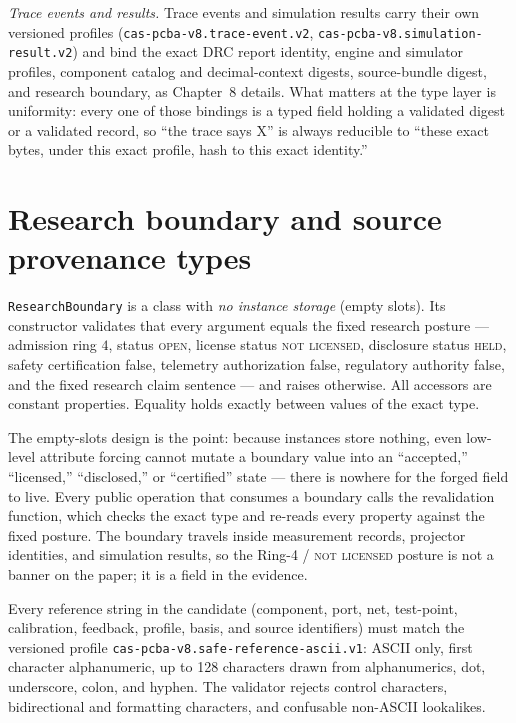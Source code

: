 \emph{Trace events and results.} Trace events and simulation results carry
their own versioned profiles (\texttt{cas-pcba-v8.trace-event.v2},
\texttt{cas-pcba-v8.simulation-result.v2}) and bind the exact DRC report
identity, engine and simulator profiles, component catalog and
decimal-context digests, source-bundle digest, and research boundary, as
Chapter~8 details. What matters at the type layer is
uniformity: every one of those bindings is a typed field holding a
validated digest or a validated record, so ``the trace says X'' is always
reducible to ``these exact bytes, under this exact profile, hash to this
exact identity.''

\section{Research boundary and source provenance types}
\label{ch04:sec:provenance}

\begin{definition}\label{ch04:def:boundary}
\texttt{ResearchBoundary} is a class with \emph{no instance storage}
(empty slots). Its constructor validates that every argument equals the
fixed research posture --- admission ring $4$, status \textsc{open},
license status \textsc{not licensed}, disclosure status \textsc{held},
safety certification false, telemetry authorization false, regulatory
authority false, and the fixed research claim sentence --- and raises
otherwise. All accessors are constant properties. Equality holds exactly
between values of the exact type.
\end{definition}

The empty-slots design is the point: because instances store nothing, even
low-level attribute forcing cannot mutate a boundary value into an
``accepted,'' ``licensed,'' ``disclosed,'' or ``certified'' state --- there
is nowhere for the forged field to live. Every public operation that
consumes a boundary calls the revalidation function, which checks the exact
type and re-reads every property against the fixed posture. The boundary
travels inside measurement records, projector identities, and simulation
results, so the Ring-4 / \textsc{not licensed} posture is not a banner on
the paper; it is a field in the evidence.

\begin{definition}\label{ch04:def:saferef}
Every reference string in the candidate (component, port, net, test-point,
calibration, feedback, profile, basis, and source identifiers) must match
the versioned profile \texttt{cas-pcba-v8.safe-reference-ascii.v1}: ASCII
only, first character alphanumeric, up to 128 characters drawn from
alphanumerics, dot, underscore, colon, and hyphen. The validator rejects
control characters, bidirectional and formatting characters, and confusable
non-ASCII lookalikes.
\end{definition}

